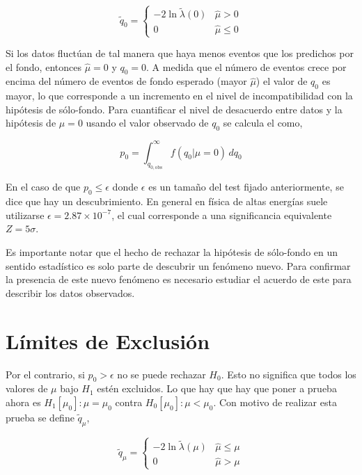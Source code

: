 \begin{equation}
  \tilde{q}_0 =
  \begin{cases}
    -2 \ln \tilde{\lambda}(0) & \hat{\mu} > 0 \\
    0 & \hat{\mu} \leq 0
  \end{cases}
\end{equation}

Si los datos fluctúan de tal manera que haya menos eventos que los predichos por
el fondo, entonces $\hat{\mu} = 0$ y $q_0=0$. A medida que el número de
eventos crece por encima del número de eventos de fondo esperado (mayor
$\hat{\mu}$) el valor de $q_0$ es mayor, lo que corresponde a un incremento en
el nivel de incompatibilidad con la hipótesis de sólo-fondo. Para cuantificar el
nivel de desacuerdo entre datos y la hipótesis de $\mu=0$ usando el valor
observado de $q_0$ se calcula el {\pvalue} como,

\begin{equation}
  p_0 = \int_{q_{0,\text{obs}}}^{\infty} f(q_0|\mu=0) \, dq_0
  \label{eq:p0}
\end{equation}

En el caso de que $p_0 \leq \epsilon$ donde $\epsilon$ es un tamaño del test
fijado anteriormente, se dice que hay un descubrimiento. En general en física de
altas energías suele utilizarse $\epsilon = 2.87 \times 10^{-7}$, el cual
corresponde a una significancia equivalente $Z=5\sigma$.

Es importante notar que el hecho de rechazar la hipótesis de sólo-fondo en un
sentido estadístico es solo parte de descubrir un fenómeno nuevo.
Para confirmar la presencia de este nuevo fenómeno es necesario estudiar
el acuerdo de este para describir los datos observados.


\section{Límites de Exclusión}

Por el contrario, si $p_0> \epsilon$ no se puede rechazar $H_0$. Esto no
significa que todos los valores de $\mu$ bajo $H_1$ estén excluidos. Lo que hay
que hay que poner a prueba ahora es $H_1[\mu_0]: \mu = \mu_0$ contra $H_0[\mu_0]: \mu < \mu_0$.
Con motivo de realizar esta prueba se define $\tilde{q}_\mu$,

\begin{equation}
  \tilde{q}_\mu =
  \begin{cases}
    -2 \ln \tilde{\lambda}(\mu) & \hat{\mu} \leq \mu \\
    0 & \hat{\mu} > \mu
  \end{cases} \label{eq:qmu}
\end{equation}

